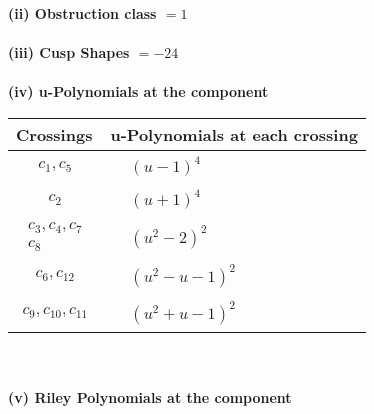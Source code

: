 \documentclass[1p]{elsarticle_modified}
\theoremstyle{definition}
\begin{document}
\flushleft \textbf{(ii) Obstruction class $= 1$}\\~\\
\flushleft \textbf{(iii) Cusp Shapes $= -24$}\\~\\
\newpage\renewcommand{\arraystretch}{1}
\flushleft \textbf{(iv) u-Polynomials at the component}\newline \\
\begin{tabular}{m{50pt}|m{274pt}}
Crossings & \hspace{64pt}u-Polynomials at each crossing \\
\hline $$\begin{aligned}c_{1},c_{5}\end{aligned}$$&$\begin{aligned}
&(u-1)^4
\end{aligned}$\\
\hline $$\begin{aligned}c_{2}\end{aligned}$$&$\begin{aligned}
&(u+1)^4
\end{aligned}$\\
\hline $$\begin{aligned}c_{3},c_{4},c_{7}\\c_{8}\end{aligned}$$&$\begin{aligned}
&(u^2-2)^2
\end{aligned}$\\
\hline $$\begin{aligned}c_{6},c_{12}\end{aligned}$$&$\begin{aligned}
&(u^2- u-1)^2
\end{aligned}$\\
\hline $$\begin{aligned}c_{9},c_{10},c_{11}\end{aligned}$$&$\begin{aligned}
&(u^2+u-1)^2
\end{aligned}$\\
\hline
\end{tabular}\\~\\
\newpage\renewcommand{\arraystretch}{1}
\flushleft \textbf{(v) Riley Polynomials at the component}\newline \\
\end{document}
